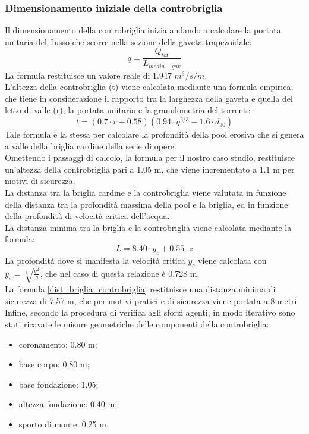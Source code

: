 \subsubsection{Dimensionamento iniziale della controbriglia}
Il dimensionamento della controbriglia inizia andando a calcolare la portata unitaria del flusso che scorre nella sezione della gaveta trapezoidale:
\begin{equation}
    q = \frac{Q_{tot}}{L_{media-gav}}
\end{equation}
La formula restituisce un valore reale di 1.947 $m^3/s/m$.\\
L'altezza della controbriglia (t) viene calcolata mediante una formula empirica, che tiene in considerazione il rapporto tra la larghezza della gaveta e quella del letto di valle (r), la portata unitaria e la granulometria del torrente:
\begin{equation}
    t= (0.7 \cdot r+0.58)(0.94 \cdot q^{2/3} - 1.6 \cdot d_{90})
\end{equation}
Tale formula è la stessa per calcolare la profondità della pool erosiva che si genera a valle della briglia cardine della serie di opere.\\
Omettendo i passaggi di calcolo, la formula per il nostro caso studio, restituisce un'altezza della controbriglia pari a 1.05 m, che viene incrementato a 1.1 m per motivi di sicurezza.\\
La distanza tra la briglia cardine e la controbriglia viene valutata in funzione della distanza tra la profondità massima della pool e la briglia, ed in funzione della profondità di velocità critica dell'acqua.\\
La distanza minima tra la briglia e la controbriglia viene calcolata mediante la formula:
\begin{equation}
    L= 8.40 \cdot y_c + 0.55 \cdot z
    \label{dist_briglia_controbriglia}
\end{equation}
La profondità dove si manifesta la velocità critica $y_c$ viene calcolata con $y_c = \sqrt[3]{\frac{q^2}{g}}$, che nel caso di questa relazione è 0.728 m.\\
La formula \ref{dist_briglia_controbriglia} restituisce una distanza minima di sicurezza di 7.57 m, che per motivi pratici e di sicurezza viene portata a 8 metri.\\
Infine, secondo la procedura di verifica agli sforzi agenti, in modo iterativo sono stati ricavate le misure geometriche delle componenti della controbriglia:
\begin{itemize}
    \item coronamento: 0.80 m;
    \item base corpo: 0.80 m;
    \item base fondazione: 1.05;
    \item altezza fondazione: 0.40 m;
    \item sporto di monte: 0.25 m.
\end{itemize}
